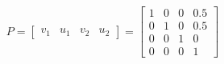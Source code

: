 $$P = \begin{bmatrix}
    v_1 & u_1 & v_2 & u_2
\end{bmatrix} = \begin{bmatrix}
    1&0&0&0.5\\
    0&1&0&0.5\\
    0&0&1&0\\
    0&0&0&1
\end{bmatrix}$$